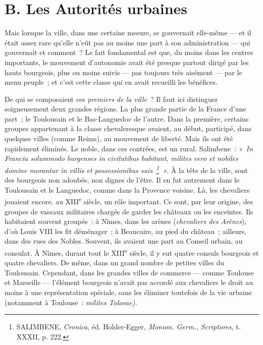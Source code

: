 \documentclass[french,twoside]{book} %
\begin{document}
\section[{B. Les Autorités urbaines}]{B. Les Autorités urbaines}
\label{c08b}
\noindent Mais lorsque la ville, dans une certaine mesure, se gouvernait elle-même — et il était assez rare qu’elle n’eût pas au moins une part à son administration — qui gouvernait et comment ? Le fait fondamental est que, du moins dans les centres importants, le mouvement d’autonomie avait été presque partout dirigé par les hauts bourgeois, plus ou moins suivis — pas toujours très aisément —  
\label{p74} par le menu peuple ; et c’est cette classe qui en avait recueilli les bénéfices.\par
De qui se composaient ces \emph{premiers de la ville} ? Il faut ici distinguer soigneusement deux grandes régions. La plus grande partie de la France d’une part ; le Toulousain et le Bas-Languedoc de l’autre. Dans la première, certains groupes appartenant à la classe chevaleresque avaient, au début, participé, dans quelques villes (comme Reims), au mouvement de liberté. Mais ils ont été rapidement éliminés. Le noble, dans ces contrées, est un rural. Salimbene : \emph{« In Francia solummodo burgenses in civitatibus habitant, milites vero et nobiles domine morantur in villis et possessionibus suis \footnote{ SALIMBENE, {\itshape Cronica}, éd. Holder-Egger, {\itshape Monum. Germ., Scriptores}, t. XXXII, p. 222.} »}. À la tête de la ville, sont des bourgeois non adoubés, non dignes de l’être. Il en fut autrement dans le Toulousain et le Languedoc, comme dans la Provence voisine. Là, les chevaliers jouaient encore, au XIII\textsuperscript{e} siècle, un rôle important. Ce sont, par leur origine, des groupes de vassaux militaires chargés de garder les châteaux ou les enceintes. Ils habitaient souvent groupés : à Nîmes, dans les arènes (\emph{chevaliers des Arènes}), d’où Louis VIII les fit déménager ; à Beaucaire, au pied du château ; ailleurs, dans des rues des Nobles. Souvent, ils avaient une part au Conseil urbain, au consulat. À Nîmes, durant tout le XIII\textsuperscript{e} siècle, il y eut quatre consuls bourgeois et quatre chevaliers. De même, dans un grand nombre de petites villes du Toulousain. Cependant, dans les grandes villes de commerce — comme Toulouse et Marseille — l’élément bourgeois n’avait pas accordé aux chevaliers le droit au moins à une représentation spéciale, sans les éliminer toutefois de la vie urbaine (notamment à Toulouse : {\itshape milites Tolosae).}\par
\end{document}
